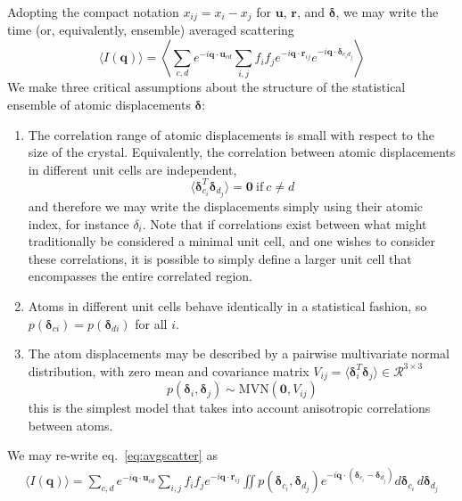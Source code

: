 \documentclass{article}
\begin{document}
Adopting the compact notation $x_{ij} = x_i - x_j$ for $\mathbf{u}$, $\mathbf{r}$, and $\boldsymbol{\delta}$, we may write the time (or, equivalently, ensemble) averaged scattering
\begin{equation}
\langle I (\mathbf{q}) \rangle = \left\langle 
\sum\limits_{c,d} e^{-i \mathbf{q} \cdot \mathbf{u}_{c d}} 
\sum\limits_{i,j} f_i f_j e^{-i \mathbf{q} \cdot \mathbf{r}_{ij}} 
e^{-i \mathbf{q} \cdot \boldsymbol{\delta}_{c_i d_j}} 
\right \rangle
\label{eq:avgscatter}
\end{equation}
%
We make three critical assumptions about the structure of the statistical ensemble of atomic displacements $\boldsymbol{\delta}$:
%
%
\begin{enumerate}

\item The correlation range of atomic displacements is small with respect to the size of the crystal. Equivalently, the correlation between atomic displacements in different unit cells are independent,
\[
\langle \boldsymbol{\delta}_{c_i}^T \boldsymbol{\delta}_{d_j} \rangle = \mathbf{0} 
\ \mathrm{if} \ c \neq d
\]
and therefore we may write the displacements simply using their atomic index, for instance ${\delta}_{i}$. Note that if correlations exist between what might traditionally be considered a minimal unit cell, and one wishes to consider these correlations, it is possible to simply define a larger unit cell that encompasses the entire correlated region.

\item Atoms in different unit cells behave identically in a statistical fashion, so $p(\boldsymbol{\delta}_{c i}) = p(\boldsymbol{\delta}_{d i})$ for all $i$.

\item The atom displacements may be described by a pairwise multivariate normal distribution, with zero mean and covariance matrix $V_{ij} = \langle \boldsymbol{\delta}_{i}^T\boldsymbol{\delta}_{j} \rangle \in \mathcal{R}^{3 \times 3}$
\[
p( \boldsymbol{\delta}_{i}, \boldsymbol{\delta}_{j} ) \sim \mathrm{MVN}( \mathbf{0}, V_{ij})
\]
this is the simplest model that takes into account anisotropic correlations between atoms.

\end{enumerate}
%
%
We may re-write eq.~\ref{eq:avgscatter} as
\begin{align}
\langle I (\mathbf{q}) \rangle =
\sum\limits_{c,d} e^{-i \mathbf{q} \cdot \mathbf{u}_{c d}} 
\sum\limits_{i,j} f_i f_j e^{-i \mathbf{q} \cdot \mathbf{r}_{ij}} 
%
\iint p( \boldsymbol{\delta}_{c_i},  \boldsymbol{\delta}_{d_j} )
e^{-i \mathbf{q} \cdot ( \boldsymbol{\delta}_{c_i}  - \boldsymbol{\delta}_{d_j})} 
d \boldsymbol{\delta}_{c_i}  \, d \boldsymbol{\delta}_{d_j}
%
\end{align}
\end{document}
